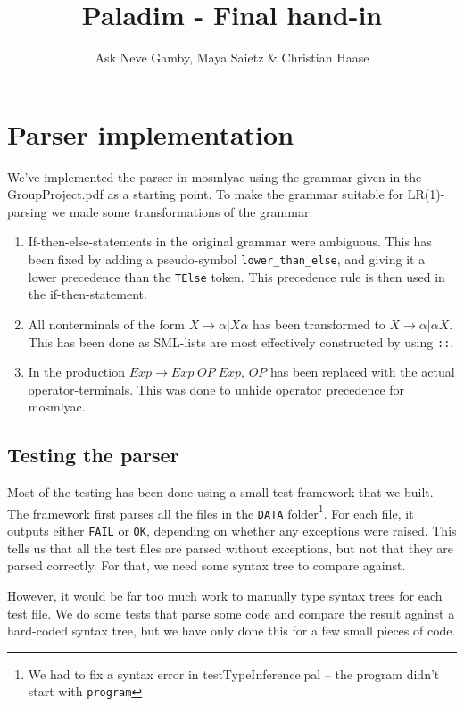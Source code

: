 \documentclass{article}
\title{Paladim - Final hand-in}
\author{Ask Neve Gamby, Maya Saietz \& Christian Haase}
\begin{document}
\tableofcontents
\maketitle
\newpage
\section{Parser implementation}
We've implemented the parser in mosmlyac using the grammar given in the GroupProject.pdf
as a starting point. To make the grammar suitable for LR(1)-parsing we made some
transformations of the grammar:
\begin{enumerate}
  \item If-then-else-statements in the original grammar were ambiguous. This has been
        fixed by adding a pseudo-symbol \texttt{lower\_than\_else}, and giving it a
        lower precedence than the \texttt{TElse} token. This precedence rule is then
        used in the if-then-statement.
  \item All nonterminals of the form $X \rightarrow \alpha | X \alpha$ has been transformed
        to $X \rightarrow \alpha | \alpha X$. This has been done as SML-lists are most
        effectively constructed by using \texttt{::}.
  \item In the production $Exp \rightarrow Exp \; OP \; Exp$, $OP$ has been replaced with
        the actual operator-terminals. This was done to unhide operator precedence for
        mosmlyac.
\end{enumerate}

\subsection{Testing the parser}
Most of the testing has been done using a small test-framework that we built. The framework
first parses all the files in the \texttt{DATA} folder\footnote{We had to fix a syntax error in testTypeInference.pal -- the program didn't start with \texttt{program}}. For each file, it outputs either
\texttt{FAIL} or \texttt{OK}, depending on whether any exceptions were raised. This tells us
that all the test files are parsed without exceptions, but not that they are parsed correctly.
For that, we need some syntax tree to compare against.

However, it would be far too much work to manually type syntax trees for each test file. We do
some tests that parse some code and compare the result against a hard-coded syntax tree, but
we have only done this for a few small pieces of code.
\end{document}

